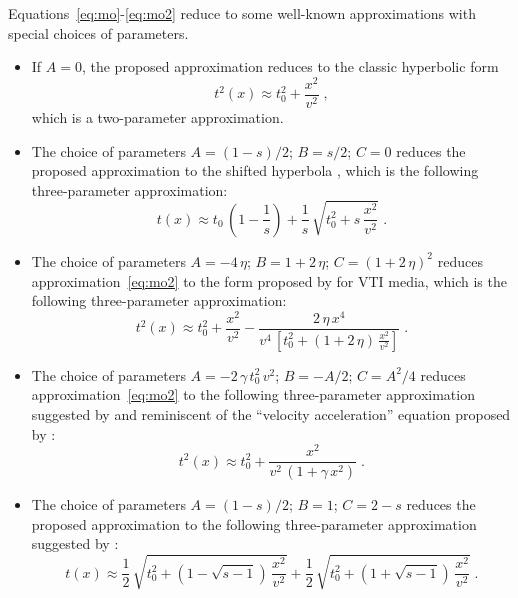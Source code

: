 Equations~\ref{eq:mo}-\ref{eq:mo2} reduce to some well-known
approximations with special choices of parameters.
\begin{itemize}

\item If $A=0$, the proposed approximation reduces to
the classic hyperbolic form
\begin{equation}
\label{eq:hyper}
t^2(x) \approx t_0^2 + \frac{x^2}{v^2}\;,
\end{equation}
which is a two-parameter approximation.

\item The choice of parameters $A=(1-s)/2$; $B=s/2$; $C=0$ reduces the proposed
approximation to the shifted hyperbola \cite[]{malovichko,GEO53-02-01430157,GEO59-06-09830999}, which is the following three-parameter
approximation:
\begin{equation}
\label{eq:shifted}
t(x) \approx t_0\,\left(1-\frac{1}{s}\right) + 
\frac{1}{s}\,\sqrt{t_0^2+s\,\frac{x^2}{v^2}}\;.
\end{equation}

\item The choice of parameters $A = - 4\,\eta$; $B = 1 + 2\,\eta$;
  $C=(1 + 2\,\eta)^2$ reduces approximation~\ref{eq:mo2} to the form
  proposed by \cite{GEO60-05-15501566} for VTI media, which is the following
  three-parameter approximation:
\begin{equation}
  \label{eq:tsvankin}
  t^2(x) \approx t_0^2 + \frac{x^2}{v^2} - 
  \frac{2\,\eta\,x^4}
  {\displaystyle v^4\,\left[t_0^2 + (1+2\,\eta)\,\frac{x^2}{v^2}\right]}\;.
\end{equation}

\item The choice of parameters $A = - 2\,\gamma\,t_0^2\,v^2$; $B =
  -A/2$; $C=A^2/4$ reduces approximation~\ref{eq:mo2} to the following
  three-parameter approximation suggested by \cite{blias2} and
  reminiscent of the ``velocity acceleration'' equation proposed by
  \cite{taner1,taner2}:
  \begin{equation}
    \label{eq:taner}
    t^2(x) \approx t_0^2 + \frac{x^2}{v^2\,(1+\gamma\,x^2)}\;.
  \end{equation}
  
\item The choice of parameters $A=(1-s)/2$; $B=1$; $C=2-s$ reduces the proposed approximation to the following 
  three-parameter approximation suggested by \cite{blias}:
  \begin{equation}
    \label{eq:blias}
    t(x) \approx 
    \frac{1}{2}\,\sqrt{t_0^2+\left(1-\sqrt{s-1}\right)\,\frac{x^2}{v^2}} +
    \frac{1}{2}\,\sqrt{t_0^2+\left(1+\sqrt{s-1}\right)\,\frac{x^2}{v^2}} \;.
  \end{equation}
  

\end{itemize}
